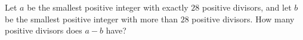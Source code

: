 Let $a$ be the smallest positive integer with exactly $28$ positive divisors, and let $b$ be the smallest positive integer with more than $28$ positive divisors. How many positive divisors does $a-b$ have?
